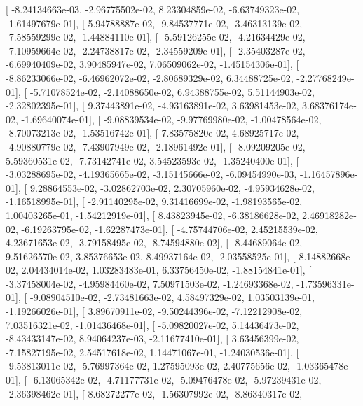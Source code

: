 \documentclass{article}
\begin{document}
       [ -8.24134663e-03,  -2.96775502e-02,   8.23304859e-02,
         -6.63749323e-02,  -1.61497679e-01],
       [  5.94788887e-02,  -9.84537771e-02,  -3.46313139e-02,
         -7.58559299e-02,  -1.44884110e-01],
       [ -5.59126255e-02,  -4.21634429e-02,  -7.10959664e-02,
         -2.24738817e-02,  -2.34559209e-01],
       [ -2.35403287e-02,  -6.69940409e-02,   3.90485947e-02,
          7.06509062e-02,  -1.45154306e-01],
       [ -8.86233066e-02,  -6.46962072e-02,  -2.80689329e-02,
          6.34488725e-02,  -2.27768249e-01],
       [ -5.71078524e-02,  -2.14088650e-02,   6.94388755e-02,
          5.51144903e-02,  -2.32802395e-01],
       [  9.37443891e-02,  -4.93163891e-02,   3.63981453e-02,
          3.68376174e-02,  -1.69640074e-01],
       [ -9.08839534e-02,  -9.97769980e-02,  -1.00478564e-02,
         -8.70073213e-02,  -1.53516742e-01],
       [  7.83575820e-02,   4.68925717e-02,  -4.90880779e-02,
         -7.43907949e-02,  -2.18961492e-01],
       [ -8.09209205e-02,   5.59360531e-02,  -7.73142741e-02,
          3.54523593e-02,  -1.35240400e-01],
       [ -3.03288695e-02,  -4.19365665e-02,  -3.15145666e-02,
         -6.09454990e-03,  -1.16457896e-01],
       [  9.28864553e-02,  -3.02862703e-02,   2.30705960e-02,
         -4.95934628e-02,  -1.16518995e-01],
       [ -2.91140295e-02,   9.31416699e-02,  -1.98193565e-02,
          1.00403265e-01,  -1.54212919e-01],
       [  8.43823945e-02,  -6.38186628e-02,   2.46918282e-02,
         -6.19263795e-02,  -1.62287473e-01],
       [ -4.75744706e-02,   2.45215539e-02,   4.23671653e-02,
         -3.79158495e-02,  -8.74594880e-02],
       [ -8.44689064e-02,   9.51626570e-02,   3.85376653e-02,
          8.49937164e-02,  -2.03558525e-01],
       [  8.14882668e-02,   2.04434014e-02,   1.03283483e-01,
          6.33756450e-02,  -1.88154841e-01],
       [ -3.37458004e-02,  -4.95984460e-02,   7.50971503e-02,
         -1.24693368e-02,  -1.73596331e-01],
       [ -9.08904510e-02,  -2.73481663e-02,   4.58497329e-02,
          1.03503139e-01,  -1.19266026e-01],
       [  3.89670911e-02,  -9.50244396e-02,  -7.12212908e-02,
          7.03516321e-02,  -1.01436468e-01],
       [ -5.09820027e-02,   5.14436473e-02,  -8.43433147e-02,
          8.94064237e-03,  -2.11677410e-01],
       [  3.63456399e-02,  -7.15827195e-02,   2.54517618e-02,
          1.14471067e-01,  -1.24030536e-01],
       [ -9.53813011e-02,  -5.76997364e-02,   1.27595093e-02,
          2.40775656e-02,  -1.03365478e-01],
       [ -6.13065342e-02,  -4.71177731e-02,  -5.09476478e-02,
         -5.97239431e-02,  -2.36398462e-01],
       [  8.68272277e-02,  -1.56307992e-02,  -8.86340317e-02,
\end{document}
